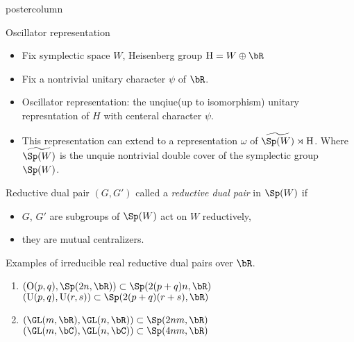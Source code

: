 \documentclass[final,hyperref={pdfpagelabels=false}]{beamer} %
\begin{document}
\begin{frame}
\begin{columns}
\begin{column}{.49\textwidth}
\begin{beamercolorbox}[center,wd=\textwidth]{postercolumn}
\begin{minipage}[T]{.95\textwidth}
{\begin{block}{Oscillator representation}
        \begin{itemize}
        \item Fix symplectic space $W$, Heisenberg group $\mathrm{H} = W\oplus \bR$ 
        \item Fix a nontrivial unitary character $\psi$ of $\bR$. 
        \item Oscillator representation: the unqiue(up to isomorphism) unitary represntation of $H$ with centeral character $\psi$.
        \item This representation can extend to a representation $\omega$ of 
          $\widetilde{\Sp(W)}\rtimes \mathrm{H}$. Where 
          $\widetilde{\Sp(W)}$ is the unquie nontrivial double cover of the symplectic group $\Sp(W)$.
        \end{itemize}
      \end{block}
      \vfill
      \begin{block}{Reductive dual pair}
        $(G,G')$ called a {\em reductive dual pair} in $\Sp(W)$ if
        \begin{itemize}
        \item $G$, $G'$  are subgroups of $\Sp(W)$ act on $W$ reductively,
        \item they are mutual centralizers.
        \end{itemize}
        Examples of irreducible real reductive dual pairs over $\bR$.
        \begin{enumerate}[Type I]
        \item 
           $(\mathrm{O}(p,q), \Sp(2n,\bR))\subset \Sp(2(p+q)n,\bR)$\\
           $(\mathrm{U}(p,q), \mathrm{U}(r,s))\subset \Sp(2(p+q)(r+s),\bR)$
        \item  $(\GL(m,\bR),\GL(n,\bR))\subset \Sp(2nm,\bR)$\\
          $(\GL(m,\bC),\GL(n,\bC))\subset \Sp(4nm,\bR)$
        \end{enumerate}
      \end{block}

}
\end{minipage}
\end{beamercolorbox}
\end{column}
\end{columns}
\end{frame}
\end{document}
